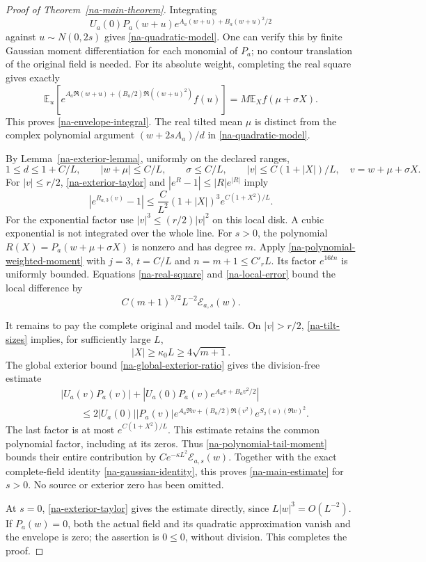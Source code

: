 \begin{proof}[Proof of Theorem~\ref{na-main-theorem}]
Integrating
\[
 U_a(0)P_a(w+u)e^{A_a(w+u)+B_a(w+u)^2/2}
\]
against $u\sim N(0,2s)$ gives \eqref{na-quadratic-model}.
One can verify this by finite Gaussian moment differentiation for each
monomial of $P_a$; no contour translation of the original field is
needed. For its absolute weight, completing the real square gives
exactly
\begin{equation}
 \mathbb E_u\left[
 e^{A_a\Re(w+u)+(B_a/2)\Re((w+u)^2)}f(u)\right]
       =M\mathbb E_X f(\mu+\sigma X).
 \label{na-real-square}
\end{equation}
This proves \eqref{na-envelope-integral}. The real tilted mean
$\mu$ is distinct from the complex polynomial argument
$(w+2sA_a)/d$ in \eqref{na-quadratic-model}.

By Lemma~\ref{na-exterior-lemma}, uniformly on the declared ranges,
\begin{equation}
 1\le d\le1+C/L,\qquad |w+\mu|\le C/L,\qquad
 \sigma\le C/L,
 \qquad |v|\le C(1+|X|)/L,
 \quad v=w+\mu+\sigma X.
 \label{na-tilt-sizes}
\end{equation}
For $|v|\le r/2$, \eqref{na-exterior-taylor} and
$|e^R-1|\le |R|e^{|R|}$ imply
\begin{equation}
 |e^{R_{a,3}(v)}-1|
 \le \frac C{L^2}(1+|X|)^3e^{C(1+X^2)/L}.
 \label{na-local-error}
\end{equation}
For the exponential factor use $|v|^3\le(r/2)|v|^2$ on this
local disk. A cubic exponential is not integrated over the whole line.
For $s>0$, the polynomial
$R(X)=P_a(w+\mu+\sigma X)$ is nonzero and has degree $m$.
Apply \eqref{na-polynomial-weighted-moment} with $j=3$,
$t=C/L$ and $n=m+1\le C'_rL$. Its factor $e^{16tn}$ is uniformly
bounded. Equations \eqref{na-real-square} and
\eqref{na-local-error} bound the local difference by
\[
 C(m+1)^{3/2}L^{-2}\mathcal E_{a,s}(w).
\]

It remains to pay the complete original and model tails. On
$|v|>r/2$, \eqref{na-tilt-sizes} implies, for sufficiently large $L$,
\[
 |X|\ge\kappa_0L\ge4\sqrt{m+1}.
\]
The global exterior bound \eqref{na-global-exterior-ratio} gives
the division-free estimate
\[
 \begin{split}
 &|U_a(v)P_a(v)|
   +|U_a(0)P_a(v)e^{A_av+B_av^2/2}|\\
 &\qquad\le
 2|U_a(0)||P_a(v)|
 e^{A_a\Re v+(B_a/2)\Re(v^2)}
 e^{S_2(a)(\Re v)^2}.
 \end{split}
\]
The last factor is at most $e^{C(1+X^2)/L}$. This estimate
retains the common polynomial factor, including at its zeros.
Thus \eqref{na-polynomial-tail-moment} bounds their entire
contribution by
$Ce^{-\kappa L^2}\mathcal E_{a,s}(w)$. Together with the exact
complete-field identity \eqref{na-gaussian-identity}, this proves
\eqref{na-main-estimate} for $s>0$. No source or exterior zero has
been omitted.

At $s=0$, \eqref{na-exterior-taylor} gives the estimate directly,
since $L|w|^3=O(L^{-2})$. If $P_a(w)=0$, both the actual field and
its quadratic approximation vanish and the envelope is zero;
the assertion is $0\le0$, without division. This completes the proof.
\end{proof}

